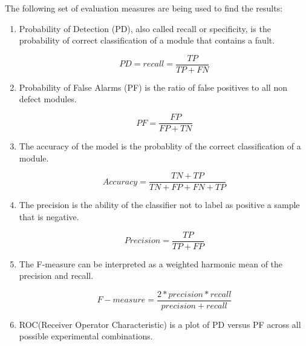 \documentclass[10pt, conference, compsocconf]{IEEEtran}
\begin{document}
The following set of evaluation measures are being used to find the results:

\begin{enumerate}
\item

  Probability of Detection (PD), also called recall or specificity, is the probability of correct classification of a module that contains a fault.

  \begin{equation}
    PD = recall = \frac{TP}{TP + FN}
  \end{equation}

\item

  Probability of False Alarms (PF) is the ratio of false positives to all non defect modules.

  \begin{equation}
    PF = \frac{FP}{FP + TN}
  \end{equation}

\item

  The accuracy of the model is the probablity of the correct classification of a module.

  \begin{equation}
    Accuracy = \frac{TN + TP}{TN + FP + FN + TP}
  \end{equation}

\item

  The precision is the ability of the classifier not to label as positive a sample that is negative.

  \begin{equation}
    Precision = \frac{TP}{TP + FP}
  \end{equation}

\item

  The F-measure can be interpreted as a weighted harmonic mean of the precision and recall.

  \begin{equation}
    F-measure = \frac{2 * precision * recall}{precision + recall}
  \end{equation}

\item

  ROC(Receiver Operator Characteristic) is a plot of PD versus PF across all possible experimental combinations.

\end{enumerate}
\end{document}
